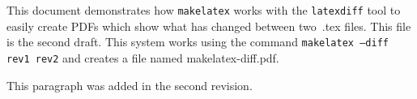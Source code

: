 \documentclass[letterpaper,12pt]{article}
\begin{document}
This document demonstrates how \texttt{makelatex} works with the \texttt{latexdiff} tool to easily create PDFs which show what has changed between two~.tex files. This file is the second draft. This system works using the command \texttt{makelatex --diff rev1 rev2} and creates a file named makelatex-diff.pdf.

This paragraph was added in the second revision.
\end{document}
